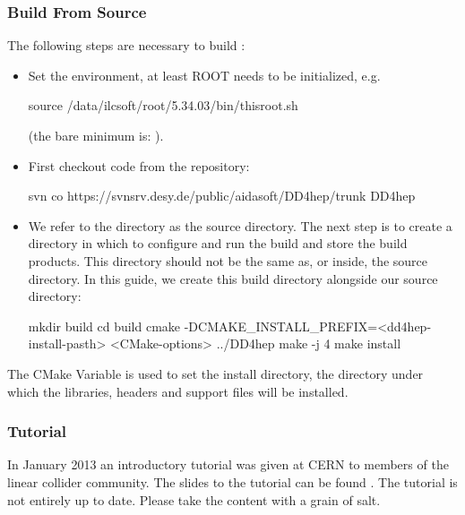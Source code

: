 \documentclass[10pt,a4paper]{article}
\begin{document}
\subsubsection{Build From Source}
\label{sec:dd4hep-user-manual-building-from-source}
\noindent
The following steps are necessary to build \DDhep:
\begin{itemize}
\item Set the environment, at least ROOT needs to be initialized, e.g.
    \begin{unnumberedcode}
      source  /data/ilcsoft/root/5.34.03/bin/thisroot.sh
    \end{unnumberedcode}
    \vspace{-0.6cm}
   (the bare minimum is: ).

\item First checkout code from the repository:
    \begin{unnumberedcode}
      svn co https://svnsrv.desy.de/public/aidasoft/DD4hep/trunk DD4hep
    \end{unnumberedcode}
    \vspace{-0.6cm}

\item We refer to the directory \DDhep as the source directory. The 
next step is to create a directory in which to configure and run the build 
and store the build products. This directory should not be the same as, or 
inside, the source directory. In this guide, we create this build directory 
alongside our source directory: 
    \begin{unnumberedcode}
      mkdir build
      cd build
      cmake -DCMAKE_INSTALL_PREFIX=<dd4hep-install-pasth> <CMake-options> ../DD4hep
      make -j 4
      make install
    \end{unnumberedcode}
\end{itemize}
The CMake Variable  is used to set the install directory, 
the directory under which the \DDhep libraries, headers and support files 
will be installed.

\subsubsection{Tutorial}
\label{sec:dd4hep-user-manual-tutorial}
\noindent
In January 2013 an introductory tutorial was given at CERN to members of the 
linear collider community. The slides to the tutorial can be found 
.
The tutorial is not entirely up to date. Please take the content with a 
grain of salt.
\end{document}
